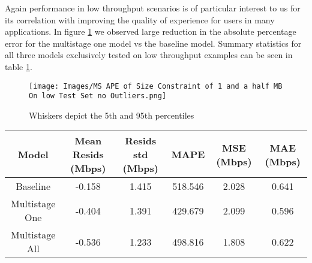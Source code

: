 Again performance in low throughput scenarios is of particular interest to us for its correlation with improving the quality of experience for users in many applications. In figure \ref{fig:ms_low_1_5_ape} we observed large reduction in the absolute percentage error for the multistage one model vs the baseline model. Summary statistics for all three models exclusively tested on low throughput examples can be seen in table \ref{tab:ms_low_1_5}.

\begin{figure}[H]
\texttt{[image: Images/MS APE of Size Constraint of 1 and a half MB On low Test Set no Outliers.png]}
\centering
\caption{Whiskers depict the 5th and 95th percentiles}
\label{fig:ms_low_1_5_ape}
\end{figure}

\begin{table}[!htb]
\centering
\begin{tabular}{|c|c|c|c|c|c|}
\hline
{Model} & {Mean Resids (Mbps)} & {Resids std (Mbps)} & {MAPE} & {MSE (Mbps)} & {MAE (Mbps)}\\
\hline
Baseline & -0.158 & 1.415 & 518.546 & 2.028 & 0.641\\
\hline
Multistage One & -0.404 & 1.391 & 429.679 & 2.099 & 0.596\\
\hline
Multistage All & -0.536 & 1.233 & 498.816 & 1.808 & 0.622\\
\hline
\end{tabular}
\label{tab:ms_low_1_5}
\end{table}